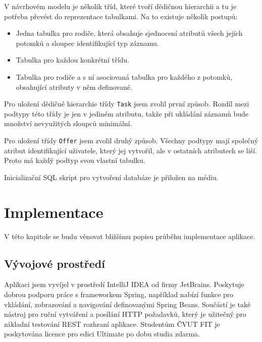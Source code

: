 \documentclass[thesis=B,czech]{FITthesis}[2012/06/26]
\begin{document}
		V návrhovém modelu je několik tříd, které tvoří dědičnou hierarchii a tu je potřeba převést do reprezentace tabulkami. Na to existuje několik postupů:
		\begin{itemize}
			\item Jedna tabulka pro rodiče, která obsahuje sjednocení atributů všech jejích potomků a sloupec identifikující typ záznamu.
			\item Tabulka pro každou konkrétní třídu.
			\item Tabulka pro rodiče a s ní asociovaná tabulka pro každého z potomků, obsahující atributy v něm definované.
		\end{itemize}
		
		Pro uložení dědičné hierarchie třídy \texttt{Task} jsem zvolil první způsob. Rozdíl mezi podtypy této třídy je jen v jediném atributu, takže při ukládání záznamů bude množství nevyužitých sloupců minimální.
		
		Pro uložení třídy \texttt{Offer} jsem zvolil druhý způsob. Všechny podtypy mají společný atribut identifikující uživatele, který jej vytvořil, ale v ostatních atributech se liší. Proto má každý podtyp svou vlastní tabulku.
		
		Inicializační SQL skript pro vytvoření databáze je přiložen na médiu. %
	
	



\chapter{Implementace}
	\label{chapter:implementation}
	
	V této kapitole se budu věnovat bližšímu popisu průběhu implementace aplikace. %
	
	\section{Vývojové prostředí}
		Aplikaci jsem vyvíjel v prostředí IntelliJ IDEA od firmy JetBrains. Poskytuje dobrou podporu práce s frameworkem Spring, například nabízí funkce pro vkládání, zobrazování a navigování definovanými Spring Beans. Součástí je také nástroj pro ruční vytváření a posílání HTTP požadavků, který je užitečný pro základní testování REST rozhraní aplikace. Studentům ČVUT FIT je poskytována licence pro edici Ultimate po dobu studia zdarma.
	
\end{document}
